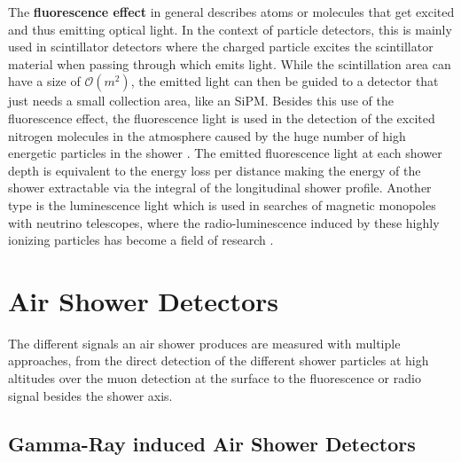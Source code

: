 The \textbf{fluorescence effect} in general describes atoms or molecules that get excited and thus emitting optical light.
In the context of particle detectors, this is mainly used in scintillator detectors where the charged particle excites the scintillator material when passing through which emits light.
While the scintillation area can have a size of $\mathcal{O}(m^2)$, the emitted light can then be guided to a detector that just needs a small collection area, like an SiPM.
Besides this use of the fluorescence effect, the fluorescence light is used in the detection of the excited nitrogen molecules in the atmosphere caused by the huge number of high energetic particles in the shower \cite{Keilhauer12Fluorescence}.
The emitted fluorescence light at each shower depth is equivalent to the energy loss per distance making the energy of the shower extractable via the integral of the longitudinal shower profile.
Another type is the luminescence light which is used in searches of magnetic monopoles with neutrino telescopes, where the radio-luminescence induced by these highly ionizing particles has become a field of research \cite{Pollmann19Luminescence}.

%
% 
%
%

\section{Air Shower Detectors}

The different signals an air shower produces are measured with multiple approaches, from the direct detection of the different shower particles at high altitudes over the muon detection at the surface to the fluorescence or radio signal besides the shower axis.

\subsection{Gamma-Ray induced Air Shower Detectors}


